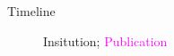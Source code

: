 \begin{frame}{Timeline}

\begin{figure}[t!] \centering
        
        \caption{\textcolor[RGB]{32,74,135}{Insitution}; \textcolor{magenta}{Publication}}
\end{figure}

\end{frame}
